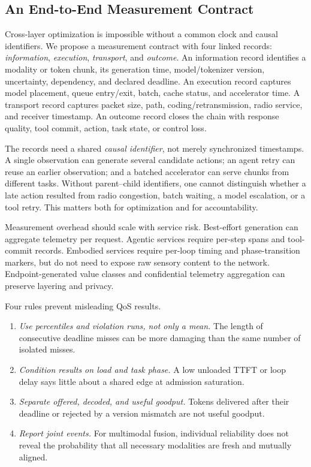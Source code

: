\documentclass[letterpaper,journal]{IEEEtran}
\begin{document}
\subsection{An End-to-End Measurement Contract}
Cross-layer optimization is impossible without a common clock and causal
identifiers. We propose a measurement contract with four linked records:
\emph{information}, \emph{execution}, \emph{transport}, and \emph{outcome}.
An information record identifies a modality or token chunk, its generation
time, model/tokenizer version, uncertainty, dependency, and declared
deadline. An execution record captures model placement, queue entry/exit,
batch, cache status, and accelerator time. A transport record captures packet
size, path, coding/retransmission, radio service, and receiver timestamp. An
outcome record closes the chain with response quality, tool commit, action,
task state, or control loss.

The records need a shared \emph{causal identifier}, not merely synchronized
timestamps. A single observation can generate several candidate actions; an
agent retry can reuse an earlier observation; and a batched accelerator can
serve chunks from different tasks. Without parent--child identifiers, one
cannot distinguish whether a late action resulted from radio congestion,
batch waiting, a model escalation, or a tool retry. This matters both for
optimization and for accountability.

Measurement overhead should scale with service risk. Best-effort generation
can aggregate telemetry per request. Agentic services require per-step spans
and tool-commit records. Embodied services require per-loop timing and
phase-transition markers, but do not need to expose raw sensory content to the
network. Endpoint-generated value classes and confidential telemetry
aggregation can preserve layering and privacy.

Four rules prevent misleading QoS results.
\begin{enumerate}
\item \emph{Use percentiles and violation runs, not only a mean.} The length
of consecutive deadline misses can be more damaging than the same number of
isolated misses.
\item \emph{Condition results on load and task phase.} A low unloaded TTFT or
loop delay says little about a shared edge at admission saturation.
\item \emph{Separate offered, decoded, and useful goodput.} Tokens delivered
after their deadline or rejected by a version mismatch are not useful
goodput.
\item \emph{Report joint events.} For multimodal fusion, individual
reliability does not reveal the probability that all necessary modalities are
fresh and mutually aligned.
\end{enumerate}
\end{document}
